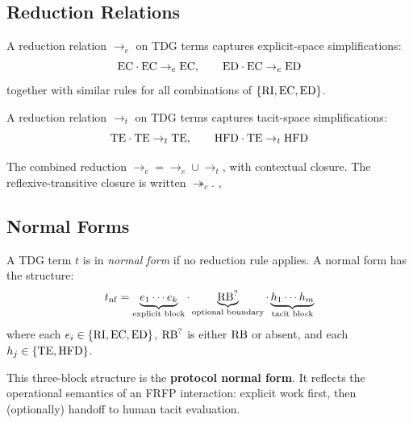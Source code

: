 \subsection{Reduction Relations}

\begin{definition}
A reduction relation $\to_e$ on TDG terms captures explicit-space
simplifications:
\[
  \mathrm{EC} \cdot \mathrm{EC} \to_e \mathrm{EC},\qquad
  \mathrm{ED} \cdot \mathrm{EC} \to_e \mathrm{ED}
\]
together with similar rules for all combinations of
$\{\mathrm{RI}, \mathrm{EC}, \mathrm{ED}\}$.
\end{definition}

\begin{definition}
A reduction relation $\to_t$ on TDG terms captures tacit-space simplifications:
\[
  \mathrm{TE} \cdot \mathrm{TE} \to_t \mathrm{TE},\qquad
  \mathrm{HFD} \cdot \mathrm{TE} \to_t \mathrm{HFD}
\]
\end{definition}

\begin{definition}
The combined reduction $\to_c = \to_e \cup \to_t$, with contextual closure.
The reflexive-transitive closure is written $\twoheadrightarrow_c$.
, 
\end{definition}

\subsection{Normal Forms}

\begin{definition}
A TDG term $t$ is in \emph{normal form} if no reduction rule applies. A normal
form has the structure:
\[
  t_{\mathrm{nf}} =
  \underbrace{e_1 \cdots e_k}_{\text{explicit block}} \cdot
  \underbrace{\mathrm{RB}^?}_{\text{optional boundary}} \cdot
  \underbrace{h_1 \cdots h_m}_{\text{tacit block}}
\]
where each $e_i \in \{\mathrm{RI}, \mathrm{EC}, \mathrm{ED}\}$, $\mathrm{RB}^?$ is either $\mathrm{RB}$ or absent,
and each $h_j \in \{\mathrm{TE}, \mathrm{HFD}\}$.

\end{definition}

This three-block structure is the \textbf{protocol normal form}. It reflects the
operational semantics of an FRFP interaction: explicit work first, then
(optionally) handoff to human tacit evaluation.

